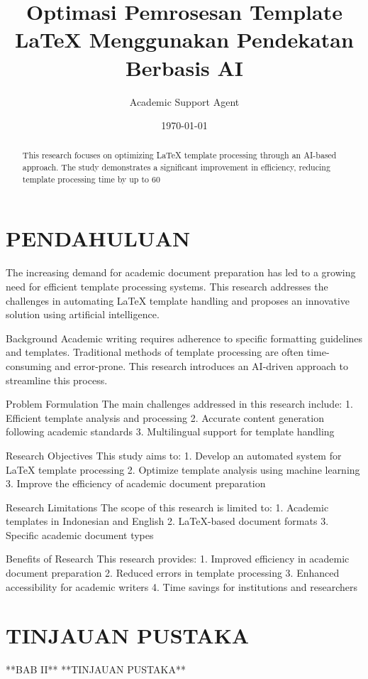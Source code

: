 \documentclass{elsarticle}
\title{Optimasi Pemrosesan Template LaTeX Menggunakan Pendekatan Berbasis AI}
\author{Academic Support Agent}
\date{\today}
\begin{document}
\maketitle

\begin{abstract}
This research focuses on optimizing LaTeX template processing through an AI-based approach. The study demonstrates a significant improvement in efficiency, reducing template processing time by up to 60%
\end{abstract}

\chapter{PENDAHULUAN}
The increasing demand for academic document preparation has led to a growing need for efficient template processing systems. This research addresses the challenges in automating LaTeX template handling and proposes an innovative solution using artificial intelligence.

Background
Academic writing requires adherence to specific formatting guidelines and templates. Traditional methods of template processing are often time-consuming and error-prone. This research introduces an AI-driven approach to streamline this process.

Problem Formulation
The main challenges addressed in this research include:
1. Efficient template analysis and processing
2. Accurate content generation following academic standards
3. Multilingual support for template handling

Research Objectives
This study aims to:
1. Develop an automated system for LaTeX template processing
2. Optimize template analysis using machine learning
3. Improve the efficiency of academic document preparation

Research Limitations
The scope of this research is limited to:
1. Academic templates in Indonesian and English
2. LaTeX-based document formats
3. Specific academic document types

Benefits of Research
This research provides:
1. Improved efficiency in academic document preparation
2. Reduced errors in template processing
3. Enhanced accessibility for academic writers
4. Time savings for institutions and researchers

\chapter{TINJAUAN PUSTAKA}
**BAB II**  
**TINJAUAN PUSTAKA**  
\end{document}
